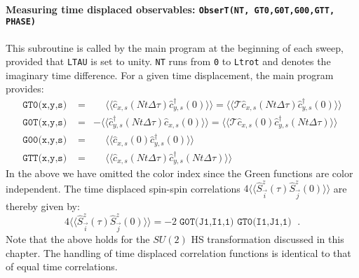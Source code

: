 \paragraph{Measuring time displaced observables: \texttt{ObserT(NT,  GT0,G0T,G00,GTT, PHASE) }}
%
This subroutine is called by the main program at the beginning of each sweep, provided that \texttt{LTAU}  is set to unity.  \texttt{NT} runs from \texttt{0}  to \texttt{Ltrot} and denotes the   imaginary time difference.   For a given time  displacement, the main program provides:
\begin{eqnarray}
\texttt{GT0(x,y,s) }  &=&   \phantom{+} \langle \langle \hat{c}^{\phantom\dagger}_{x,s} (Nt \Delta \tau)   \hat{c}^{\dagger}_{y,s} (0)   \rangle \rangle = \langle \langle \mathcal{T} \hat{c}^{\phantom\dagger}_{x,s} (Nt \Delta \tau)   \hat{c}^{\dagger}_{y,s} (0)   \rangle \rangle  \nonumber \\
\texttt{G0T(x,y,s) }   &=&  -   \langle \langle   \hat{c}^{\dagger}_{y,s} (Nt \Delta \tau)    \hat{c}^{\phantom\dagger}_{x,s} (0)    \rangle \rangle =
    \langle \langle \mathcal{T} \hat{c}^{\phantom\dagger}_{x,s} (0)    \hat{c}^{\dagger}_{y,s} (Nt \Delta \tau)   \rangle \rangle  \nonumber  \\
  \texttt{G00(x,y,s) }  &=&    \phantom{+} \langle \langle \hat{c}^{\phantom\dagger}_{x,s} (0)   \hat{c}^{\dagger}_{y,s} (0)   \rangle \rangle    \nonumber \\
    \texttt{GTT(x,y,s) }  &=&   \phantom{+} \langle \langle \hat{c}^{\phantom\dagger}_{x,s} (Nt \Delta \tau)   \hat{c}^{\dagger}_{y,s} (Nt \Delta \tau)   \rangle \rangle    
\end{eqnarray}
In the above we have omitted the color index since  the  Green functions are color independent.  The time displaced  spin-spin correlations 
$ 4 \langle \langle \hat{S}^{z}_{\vec{i}} (\tau)  \hat{S}^{z}_{\vec{j}} (0)\rangle \rangle   $ 
are thereby given by: 
\begin{equation}
	4 \langle \langle \hat{S}^{z}_{\vec{i}} (\tau)  \hat{S}^{z}_{\vec{j}} (0)\rangle \rangle   = - 2 \; \texttt{G0T(J1,I1,1) } \texttt{GT0(I1,J1,1) } \;.
\end{equation}
Note that the above holds for the $SU(2)$ HS transformation discussed in this chapter. 
The handling of time displaced correlation functions is identical to that of equal time correlations. 

